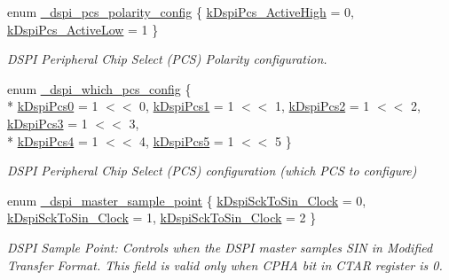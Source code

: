 \begin{DoxyCompactItemize}
\item 
enum \hyperlink{group__dspi__hal_ga1b2a1103a54ad51c35f2bdaa52ac7363}{\+\_\+dspi\+\_\+pcs\+\_\+polarity\+\_\+config} \{ \hyperlink{group__dspi__hal_gga1b2a1103a54ad51c35f2bdaa52ac7363ac82558209fcd03cfcff410f43ccd13df}{k\+Dspi\+Pcs\+\_\+\+Active\+High} = 0, 
\hyperlink{group__dspi__hal_gga1b2a1103a54ad51c35f2bdaa52ac7363af89a174f7da2c2d1dd94eaee5f451ac7}{k\+Dspi\+Pcs\+\_\+\+Active\+Low} = 1
 \}\begin{DoxyCompactList}\small\item\em D\+S\+PI Peripheral Chip Select (P\+CS) Polarity configuration. \end{DoxyCompactList}
\item 
enum \hyperlink{group__dspi__hal_ga738d1c33c04047440e86e29fabbbba94}{\+\_\+dspi\+\_\+which\+\_\+pcs\+\_\+config} \{ \\*
\hyperlink{group__dspi__hal_gga738d1c33c04047440e86e29fabbbba94abf98b398d467bec5ce1332e7769b9c97}{k\+Dspi\+Pcs0} = 1 $<$$<$ 0, 
\hyperlink{group__dspi__hal_gga738d1c33c04047440e86e29fabbbba94aae6b37fc82d8d2b7425b85dd63172acf}{k\+Dspi\+Pcs1} = 1 $<$$<$ 1, 
\hyperlink{group__dspi__hal_gga738d1c33c04047440e86e29fabbbba94aa57c28d2307f3a08d2ca37fede94704b}{k\+Dspi\+Pcs2} = 1 $<$$<$ 2, 
\hyperlink{group__dspi__hal_gga738d1c33c04047440e86e29fabbbba94a009e764ff551a29673559bdf51e68b37}{k\+Dspi\+Pcs3} = 1 $<$$<$ 3, 
\\*
\hyperlink{group__dspi__hal_gga738d1c33c04047440e86e29fabbbba94a68dbb918dfd1398b2b161142e99a2b76}{k\+Dspi\+Pcs4} = 1 $<$$<$ 4, 
\hyperlink{group__dspi__hal_gga738d1c33c04047440e86e29fabbbba94a4fa2a14f449a06e76693a89b6861157c}{k\+Dspi\+Pcs5} = 1 $<$$<$ 5
 \}\begin{DoxyCompactList}\small\item\em D\+S\+PI Peripheral Chip Select (P\+CS) configuration (which P\+CS to configure) \end{DoxyCompactList}
\item 
enum \hyperlink{group__dspi__hal_ga02a53597bff1469f0365b74ad7a20237}{\+\_\+dspi\+\_\+master\+\_\+sample\+\_\+point} \{ \hyperlink{group__dspi__hal_gga02a53597bff1469f0365b74ad7a20237a6031fe2cc4a3f05a525ed515736fe8fc}{k\+Dspi\+Sck\+To\+Sin\+\_\+Clock} = 0, 
\hyperlink{group__dspi__hal_gga02a53597bff1469f0365b74ad7a20237a369e0c0de897725cc26ecbe774c52cea}{k\+Dspi\+Sck\+To\+Sin\+\_\+Clock} = 1, 
\hyperlink{group__dspi__hal_gga02a53597bff1469f0365b74ad7a20237a22ba66b2d6cfc7ab9e75415894aa457d}{k\+Dspi\+Sck\+To\+Sin\+\_\+Clock} = 2
 \}\begin{DoxyCompactList}\small\item\em D\+S\+PI Sample Point\+: Controls when the D\+S\+PI master samples S\+IN in Modified Transfer Format. This field is valid only when C\+P\+HA bit in C\+T\+AR register is 0. \end{DoxyCompactList}

\end{DoxyCompactItemize}
